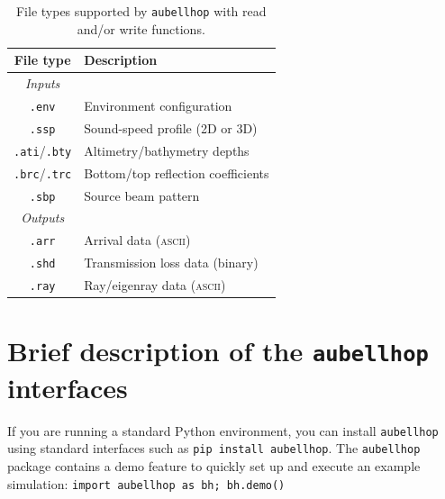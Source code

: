 \documentclass{internoise2026-wr}
\begin{document}
\begin{table}
\centering
\caption{File types supported by \texttt{aubellhop} with read and/or write functions.}
\begin{tabular}{cl}
\toprule
File type & Description \\
\midrule
\emph{Inputs} \\
\verb".env" & Environment configuration \\
\verb".ssp" & Sound-speed profile (2D or 3D) \\
\verb".ati"/\verb".bty" & Altimetry/bathymetry depths \\
\verb".brc"/\verb".trc" & Bottom/top reflection coefficients \\
\verb".sbp" & Source beam pattern \\
\midrule
\emph{Outputs} \\
\verb".arr" & Arrival data (\textsc{ascii})     \\
\verb".shd" & Transmission loss data (binary)     \\
\verb".ray" & Ray/eigenray data (\textsc{ascii})     \\
\bottomrule
\end{tabular}
\end{table}

\section{Brief description of the \texttt{aubellhop} interfaces}
\label{sec:interfaces}

If you are running a standard Python environment, you can install \texttt{aubellhop} using standard interfaces such as \verb|pip install aubellhop|. The \texttt{aubellhop} package contains a demo feature to quickly set up and execute an example simulation: \verb|import aubellhop as bh; bh.demo()|
\end{document}
